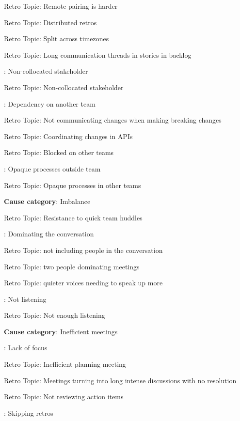 \quad \quad \quad Retro Topic: Remote pairing is harder

\quad \quad \quad Retro Topic: Distributed retros

\quad \quad \quad Retro Topic: Split across timezones

\quad \quad \quad Retro Topic: Long communication threads in stories in backlog

\quad {}: Non-collocated stakeholder

\quad \quad \quad Retro Topic: Non-collocated stakeholder

\quad {}: Dependency on another team

\quad \quad \quad Retro Topic: Not communicating changes when making breaking changes

\quad \quad \quad Retro Topic: Coordinating changes in APIs

\quad \quad \quad Retro Topic: Blocked on other teams

\quad {}: Opaque processes outside team

\quad \quad \quad Retro Topic: Opaque processes in other teams

\quad \textbf{Cause category}: Imbalance

\quad \quad Retro Topic: Resistance to quick team huddles

\quad {}: Dominating the conversation

\quad \quad \quad Retro Topic: not including people in the conversation

\quad \quad \quad Retro Topic: two people dominating meetings

\quad \quad \quad Retro Topic: quieter voices needing to speak up more

\quad {}: Not listening

\quad \quad \quad Retro Topic: Not enough listening

\quad \textbf{Cause category}: Inefficient meetings

\quad {}: Lack of focus

\quad \quad \quad Retro Topic: Inefficient planning meeting

\quad \quad \quad Retro Topic: Meetings turning into long intense discussions with no resolution

\quad \quad \quad Retro Topic: Not reviewing action items

\quad {}: Skipping retros

